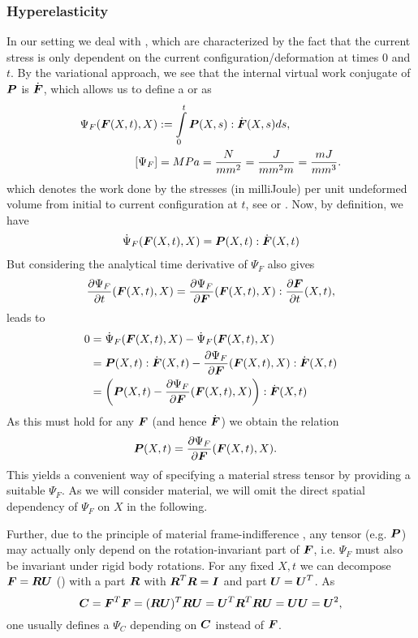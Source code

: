 \subsubsection{Hyperelasticity}
In our setting we deal with , which are characterized by the fact that the current stress is only dependent on the
current configuration/deformation at times $0$ and $t$.
By the variational approach, we see that the internal virtual work conjugate of $\boldsymbol{P}$ is $\dot{\boldsymbol{F}}$,
which allows us to define a  or  as
\begin{align*}
	\Psi_F(\boldsymbol{F}(X,t),X) &:= \int\limits_{0}^{t}\boldsymbol{P}(X,s):\dot{\boldsymbol{F}}(X,s)ds,\\
	[\Psi_F] &= MPa = \frac{N}{mm^2} = \frac{J}{mm^2m} = \frac{mJ}{mm^3}.
\end{align*}
which denotes the work done by the stresses (in milliJoule) per unit undeformed volume from initial to current configuration at $t$,
see \cite[p.156]{Bonet2008} or \cite[p.207]{Holzapfel2000}.
Now, by definition, we have
\begin{align}
	\dot{\Psi}_F(\boldsymbol{F}(X,t),X) = \boldsymbol{P}(X,t):\dot{\boldsymbol{F}}(X,t)\label{eq:psif_dt1}
\end{align}
But considering the analytical time derivative of $\Psi_F$ also gives 
\begin{align}
	\frac{\partial \Psi_F}{\partial t}(\boldsymbol{F}(X,t),X) = \frac{\partial \Psi_F}{\partial \boldsymbol{F}}(\boldsymbol{F}(X,t),X):\frac{\partial \boldsymbol{F}}{\partial t}(X,t),\label{eq:psif_dt2} 
\end{align}
leads to
\begin{align*}
	0 &= \dot{\Psi}_F(\boldsymbol{F}(X,t),X) - \dot{\Psi}_F(\boldsymbol{F}(X,t),X)\\
	 &= \boldsymbol{P}(X,t):\dot{\boldsymbol{F}}(X,t) - \frac{\partial \Psi_F}{\partial \boldsymbol{F}}(\boldsymbol{F}(X,t),X):\dot{\boldsymbol{F}}(X,t)\\
	 &= \left(\boldsymbol{P}(X,t) - \frac{\partial \Psi_F}{\partial \boldsymbol{F}}(\boldsymbol{F}(X,t),X)\right):\dot{\boldsymbol{F}}(X,t)
\end{align*}
As this must hold for any $\boldsymbol{F}$ (and hence $\dot{\boldsymbol{F}}$) we obtain the relation
\begin{align}
	\boldsymbol{P}(X,t) &= \frac{\partial \Psi_F}{\partial \boldsymbol{F}}(\boldsymbol{F}(X,t),X).
\end{align}
This yields a convenient way of specifying a material stress tensor by providing a suitable $\Psi_F$.
As we will consider  material, we will omit the direct spatial dependency of $\Psi_F$ on $X$ in the following.

Further, due to the principle of material frame-indifference \cite[p.198]{Holzapfel2000}, any tensor (e.g. $\boldsymbol{P}$)
may actually only depend on the rotation-invariant part of $\boldsymbol{F}$, i.e. $\Psi_F$ must also be invariant under rigid body rotations.
For any fixed $X,t$ we can decompose $\boldsymbol{F} = \boldsymbol{R}\boldsymbol{U}$ (\cite[p.85]{Holzapfel2000}) with a
 part $\boldsymbol{R}$ with $\boldsymbol{R}^T\boldsymbol{R} = \boldsymbol{I}$ and  part $\boldsymbol{U} = \boldsymbol{U}^T$.
As
\[
	\boldsymbol{C} = \boldsymbol{F}^T\boldsymbol{F} = (\boldsymbol{R}\boldsymbol{U})^T\boldsymbol{R}\boldsymbol{U} = \boldsymbol{U}^T\boldsymbol{R}^T\boldsymbol{R}\boldsymbol{U} = \boldsymbol{U}\boldsymbol{U} = \boldsymbol{U}^2, 
\]
one usually defines a $\Psi_C$ depending on $\boldsymbol{C}$ instead of $\boldsymbol{F}$.

